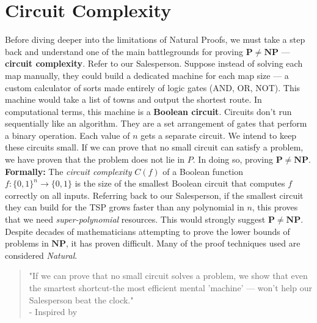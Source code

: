 \documentclass[12pt]{report}
\begin{document}
\section{Circuit Complexity}
Before diving deeper into the limitations of Natural Proofs, we must take a step back and understand one of the main battlegrounds for proving $\mathbf{P \ne NP}$ --- \textbf{circuit complexity}.
Refer to our Salesperson.
Suppose instead of solving each map manually, they could build a dedicated machine for each map size --- a custom calculator of sorts made entirely of logic gates (AND, OR, NOT).
This machine would take a list of towns and output the shortest route.
In computational terms, this machine is a \textbf{Boolean circuit}.
Circuits don't run sequentially like an algorithm.
They are a set arrangement of gates that perform a binary operation.
Each value of $n$ gets a separate circuit.
We intend to keep these circuits small.
If we can prove that no small circuit can satisfy a problem, we have proven that the problem does not lie in $P$.
In doing so, proving $\mathbf{P \ne NP}$.
\vspace{0.2cm}
\textbf{Formally:}
The \textit{circuit complexity} $C(f)$ of a Boolean function $f : \{0,1\}^n \rightarrow \{0,1\}$ is the size of the smallest Boolean circuit that computes $f$ correctly on all inputs.
\vspace{0.1cm}
Referring back to our Salesperson, if the smallest circuit they can build for the TSP grows faster than any polynomial in $n$, this proves that we need \textit{super-polynomial} resources.
This would strongly suggest $\mathbf{P \ne NP}$.
\vspace{0.2cm}
Despite decades of mathematicians attempting to prove the lower bounds of problems in $\mathbf{NP}$, it has proven difficult.
Many of the proof techniques used are considered \textit{Natural}.
\begin{quote}
    "If we can prove that no small circuit solves a problem, we show that even the smartest shortcut-the most efficient mental 'machine' --- won't help our Salesperson beat the clock."\\
    - Inspired by~\cite{fortnow2009status}
\end{quote}
\end{document}
